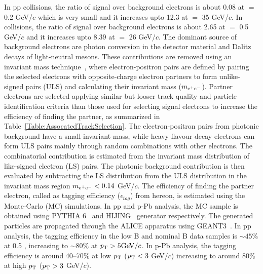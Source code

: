 In pp collisions, the ratio of signal over background electrons is about 0.08 at \pt $=$ 0.2 GeV/$c$ which is very small and it increases upto 12.3 at \pt $=$ 35 GeV/$c$. In \pPb collisions, the ratio of signal over background electrons is about 2.65 at \pt $=$ 0.5 GeV/$c$ and it increases upto 8.39  at \pt $=$ 26 GeV/$c$.  The dominant source of background electrons are photon conversion in the detector material and Dalitz decays of light-neutral mesons. These contributions are removed using an invariant mass technique~\cite{Adam:2015qda}, where electron-positron pairs are defined by pairing the selected electrons with opposite-charge electron partners to form unlike-signed pairs (ULS) and calculating their invariant mass ($ m_{\rm e^{+}e^{-}}$). Partner electrons are selected applying similar but looser track quality and particle identification criteria than those used for selecting signal electrons to increase the efficiency of finding the partner, as summarized in Table~\ref{Table:AssocatedTrackSelection}. The electron-positron pairs from photonic background have a small invariant mass, while heavy-flavour decay electrons can form
ULS pairs mainly through random combinations with other electrons.
The combinatorial contribution is estimated from the invariant mass distribution of
like-signed electron (LS) pairs. The photonic background contribution is then evaluated by subtracting the LS distribution from the ULS distribution in the invariant mass region $m_{\rm e^{+}e^{-}} < 0.14$ GeV/$c$. The efficiency of finding the partner electron, called as tagging efficiency ($\epsilon_{tag}$) from hereon, is estimated using the Monte-Carlo (MC) simulations. In pp and p-Pb analysis, the MC sample is obtained using PYTHIA 6~\cite{Sjostrand:2006za} and HIJING~\cite{Wang:1991hta} generator respectively.  The generated particles are propagated through the ALICE apparatus using GEANT3~\cite{Brun:1073159}.
In pp analysis, the tagging efficiency in the low B and nominal B data samples is $\sim 45\%$ at 0.5 \GeVc, increasing to $\sim 80\%$ at ${\it p}_{\rm T} > 5 {\rm GeV/}c$. 
In p-Pb analysis, the tagging efficiency is around {40--70\%}  at low $p_{\rm{T}}$ ($p_{\rm{T}} < 3$ GeV/$c$) increasing to around 80\% at high $p_{\rm{T}}$ ($p_{\rm{T}} > 3$ GeV/$c$).

